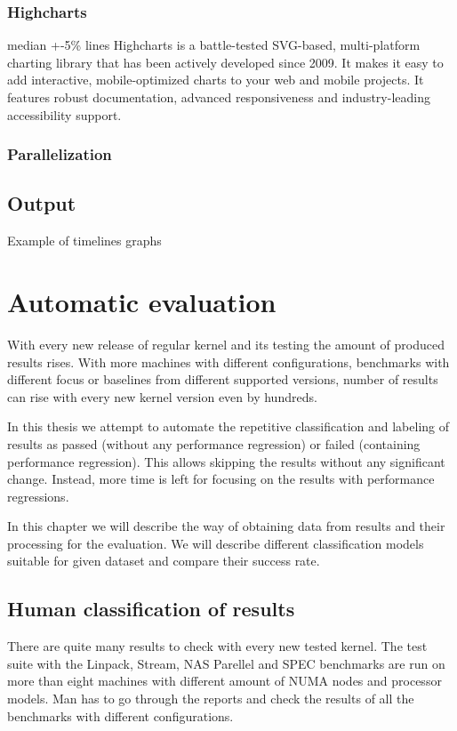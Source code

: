 \subsection{Highcharts}
median +-5\% lines
Highcharts\cite{highcharts} is a battle-tested SVG-based, multi-platform charting library that has been actively developed since 2009. It makes it easy to add interactive, mobile-optimized charts to your web and mobile projects. It features robust documentation, advanced responsiveness and industry-leading accessibility support.

\subsection{Parallelization}

\section{Output}
Example of timelines graphs



\chapter{Automatic evaluation} \label{ch:ai}
With every new release of regular kernel and its testing the amount of produced
results rises. With more machines with different configurations, benchmarks with
different focus or baselines from different supported versions, number of results
can rise with every new kernel version even by hundreds.

In this thesis we attempt to automate the repetitive classification and
labeling of results as passed (without any performance regression) or failed
(containing performance regression). This allows skipping the results without
any significant change. Instead, more time is left for focusing on the results
with performance regressions.

In this chapter we will describe the way of obtaining data from results and
their processing for the evaluation. We will describe different classification
models suitable for given dataset and compare their success rate.

\section{Human classification of results}
There are quite many results to check with every new tested kernel. The test
suite with the Linpack, Stream, NAS Parellel and SPEC benchmarks are run on more
than eight machines with different amount of NUMA nodes and processor models.
Man has to go through the reports and check the results of all the benchmarks
with different configurations.

